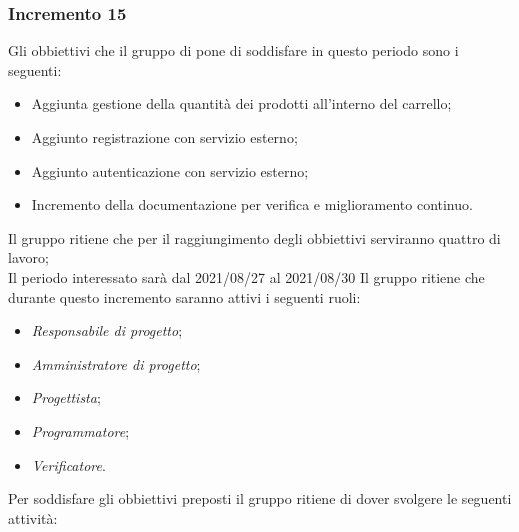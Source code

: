 \subsubsection{Incremento 15}
Gli obbiettivi che il gruppo di pone di soddisfare in questo periodo sono i seguenti:
\begin{itemize}
    \item Aggiunta gestione della quantità dei prodotti all'interno del carrello;
    \item Aggiunto registrazione con servizio esterno;
    \item Aggiunto autenticazione con servizio esterno;
    \item Incremento della documentazione per verifica e miglioramento continuo.
\end{itemize}
Il gruppo ritiene che per il raggiungimento degli obbiettivi serviranno quattro di lavoro;\\
Il periodo interessato sarà dal 2021/08/27 al 2021/08/30
Il gruppo ritiene che durante questo incremento saranno attivi i seguenti ruoli:
\begin{itemize}
    \item \textit{Responsabile di progetto};
    \item \textit{Amministratore di progetto};
    \item \textit{Progettista};
    \item \textit{Programmatore};
    \item \textit{Verificatore}.
\end{itemize}
Per soddisfare gli obbiettivi preposti il gruppo ritiene di dover svolgere le seguenti attività:
